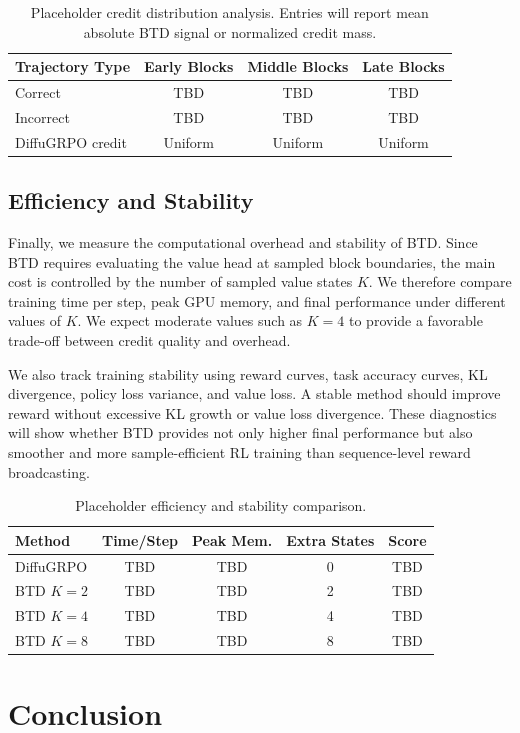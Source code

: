 \documentclass[letterpaper]{article}
\begin{document}
\begin{table}[t]
\centering
\small
\begin{tabular}{lccc}
\hline
Trajectory Type & Early Blocks & Middle Blocks & Late Blocks \\
\hline
Correct & TBD & TBD & TBD \\
Incorrect & TBD & TBD & TBD \\
DiffuGRPO credit & Uniform & Uniform & Uniform \\
\hline
\end{tabular}
\caption{Placeholder credit distribution analysis. Entries will report mean absolute BTD signal or normalized credit mass.}
\label{tab:credit_distribution}
\end{table}

\subsection{Efficiency and Stability}

Finally, we measure the computational overhead and stability of BTD. Since BTD requires evaluating the value head at sampled block boundaries, the main cost is controlled by the number of sampled value states $K$. We therefore compare training time per step, peak GPU memory, and final performance under different values of $K$. We expect moderate values such as $K=4$ to provide a favorable trade-off between credit quality and overhead.

We also track training stability using reward curves, task accuracy curves, KL divergence, policy loss variance, and value loss. A stable method should improve reward without excessive KL growth or value loss divergence. These diagnostics will show whether BTD provides not only higher final performance but also smoother and more sample-efficient RL training than sequence-level reward broadcasting.

\begin{table}[t]
\centering
\small
\begin{tabular}{lcccc}
\hline
Method & Time/Step & Peak Mem. & Extra States & Score \\
\hline
DiffuGRPO & TBD & TBD & 0 & TBD \\
BTD $K=2$ & TBD & TBD & 2 & TBD \\
BTD $K=4$ & TBD & TBD & 4 & TBD \\
BTD $K=8$ & TBD & TBD & 8 & TBD \\
\hline
\end{tabular}
\caption{Placeholder efficiency and stability comparison.}
\label{tab:efficiency}
\end{table}

\section{Conclusion}
\label{sec:conclusion}



\end{document}
